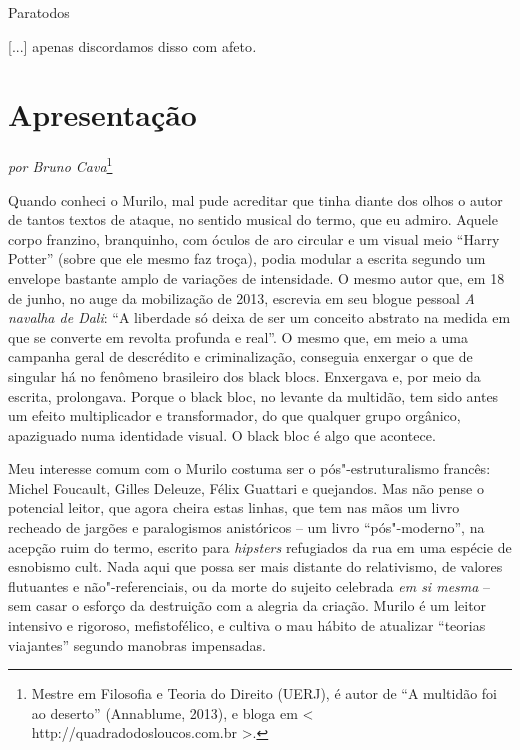 
Paratodos

{[}...{]} apenas discordamos disso com afeto\emph{.}

\chapter{Apresentação}

\begin{flushright}
\emph{por Bruno Cava}\footnote{Mestre em Filosofia e Teoria do Direito (UERJ), é autor de ``A multidão foi ao deserto'' (Annablume, 2013), e bloga em \textless{} http://quadradodosloucos.com.br \textgreater{}.}
\end{flushright}

\textbf{}Quando conheci o Murilo, mal pude acreditar que tinha diante
dos olhos o autor de tantos textos de ataque, no sentido musical do
termo, que eu admiro. Aquele corpo franzino, branquinho, com óculos de
aro circular e um visual meio ``Harry Potter'' (sobre que ele mesmo faz
troça), podia modular a escrita segundo um envelope bastante amplo de
variações de intensidade. O mesmo autor que, em 18 de junho, no auge da
mobilização de 2013, escrevia em seu blogue pessoal \emph{A navalha de
Dali}: ``A liberdade só deixa de ser um conceito abstrato na medida em
que se converte em revolta profunda e real''. O mesmo que, em meio a uma
campanha geral de descrédito e criminalização, conseguia enxergar o que
de singular há no fenômeno brasileiro dos black blocs. Enxergava e, por
meio da escrita, prolongava. Porque o black bloc, no levante da
multidão, tem sido antes um efeito multiplicador e transformador, do que
qualquer grupo orgânico, apaziguado numa identidade visual. O black bloc
é algo que acontece.

Meu interesse comum com o Murilo costuma ser o pós"-estruturalismo
francês: Michel Foucault, Gilles Deleuze, Félix Guattari e quejandos.
Mas não pense o potencial leitor, que agora cheira estas linhas, que tem
nas mãos um livro recheado de jargões e paralogismos anistóricos -- um
livro ``pós"-moderno'', na acepção ruim do termo, escrito para
\emph{hipsters} refugiados da rua em uma espécie de esnobismo cult. Nada
aqui que possa ser mais distante do relativismo, de valores flutuantes e
não"-referenciais, ou da morte do sujeito celebrada \emph{em si mesma} --
sem casar o esforço da destruição com a alegria da criação. Murilo é um
leitor intensivo e rigoroso, mefistofélico, e cultiva o mau hábito de
atualizar ``teorias viajantes'' segundo manobras impensadas.

